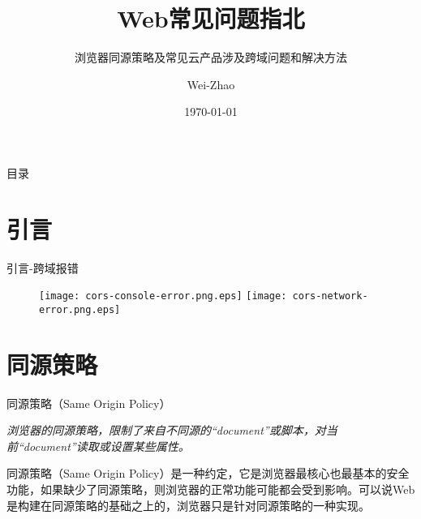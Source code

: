 \documentclass[aspectratio=169,xcolor=dvipsnames,UTF8]{beamer}
\title[Web常见问题指北]{Web常见问题指北}
\subtitle{浏览器同源策略及常见云产品涉及跨域问题和解决方法}
\author[Wei-Zhao] {Wei-Zhao}
\institute[Anchnet] 
{
    Anchen.Net
}
\date{\today}
\begin{document}
\begin{frame}
    \titlepage
\end{frame}


\begin{frame}{目录}
    \tableofcontents
\end{frame}



\section{引言}
\begin{frame}{引言-跨域报错}

	\begin{figure}
		\texttt{[image: cors-console-error.png.eps]}
		\texttt{[image: cors-network-error.png.eps]}
	\end{figure}

\end{frame}

\section{同源策略}
\begin{frame}{同源策略（Same Origin Policy）}
	\begin{block}{}
			\emph{浏览器的同源策略，限制了来自不同源的“document”或脚本，对当前“document”读取或设置某些属性。}
	\end{block}
	\vspace{2em}
\setlength{\parindent}{2em}同源策略（Same Origin Policy）是一种约定，它是浏览器最核心也最基本的安全功能，如果缺少了同源策略，则浏览器的正常功能可能都会受到影响。可以说Web是构建在同源策略的基础之上的，浏览器只是针对同源策略的一种实现。
	
\end{frame}
\end{document}
